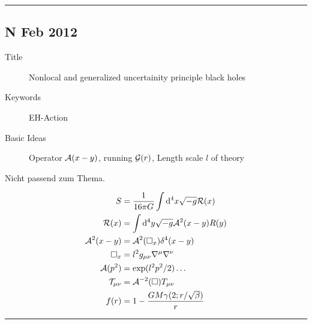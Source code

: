 \documentclass[10pt,a4paper, fleqn]{article}
\begin{document}
\rule{0.9\textwidth}{0.4pt}
\pagebreak
\begin{multicols}{2}

\subsection{N Feb 2012}
\begin{description}
  \item[Title] Nonlocal and generalized uncertainity principle black holes
  \item[Keywords] EH-Action
  \item[Basic Ideas] Operator ${\cal A}(x-y)$, running ${\cal G}(r)$, Length scale $l$ of theory
\end{description}

Nicht passend zum Thema.

\vfill
\columnbreak

\begin{align*}
S &= \frac{1}{16 \pi G} \int \mathrm{d}^4 x \sqrt{-g} {\cal R}(x) \\
{\cal R}(x) &= \int \mathrm{d}^4 y \sqrt{-g} {\cal A}^2(x-y) R(y) \\
{\cal A}^2(x-y) &= {\cal A}^2 (\square_x) \delta^4 (x-y) \\
\square_x &= l^2 g_{\mu\nu} \nabla^\mu \nabla^\nu \\
{\cal A}(p^2) &= \exp( {l}^2 p^2 / 2) \dots \\
{\cal T}_{\mu \nu} &= {\cal A}^{-2}(\square) T_{\mu \nu} \\
f(r) &= 1 - \frac{G M \gamma(2;r/\sqrt{\beta})}{r}
\end{align*}

\end{multicols}
\rule{0.9\textwidth}{0.4pt}
\end{document}
